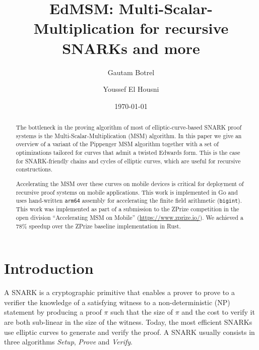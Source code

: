 \documentclass[journal=tches,spthm]{iacrtrans}
\title{EdMSM: Multi-Scalar-Multiplication for recursive SNARKs and more}
\author{Gautam Botrel \inst{1} \and Youssef El Housni \inst{1,2,3}}
\institute{ConsenSys R\&D, gnark team  \\
   \email{{firstname.lastname}@consensys.net}
  \and
    LIX, CNRS, \'{E}cole Polytechnique, Institut Polytechnique de Paris
  \and
    Inria
}
\date{\today}
\begin{document}
\maketitle


\begin{abstract}
The bottleneck in the proving algorithm of most of elliptic-curve-based SNARK
    proof systems is the Multi-Scalar-Multiplication (MSM) algorithm. In this
    paper we give an overview of a variant of the Pippenger MSM algorithm
    together with a set of optimizations tailored for curves that admit a
    twisted Edwards form. This is the case for SNARK-friendly chains and cycles
    of elliptic curves, which are useful for recursive constructions.

Accelerating the MSM over these curves on mobile devices is critical
    for deployment of recursive proof systems on mobile applications.
    This work is implemented in Go and uses hand-written
    \texttt{arm64} assembly for accelerating the finite field
    arithmetic (\texttt{bigint}).  This work was implemented as part
    of a submission to the ZPrize competition in the open division
    ``Accelerating MSM on Mobile'' (\url{https://www.zprize.io/}).
    We achieved a 78\% speedup over the ZPrize baseline implementation
    in Rust.
\end{abstract}

\section{Introduction}
A SNARK is a cryptographic primitive that enables a prover to prove to a
verifier the knowledge of a satisfying witness to a non-deterministic (NP)
statement by producing a proof $\pi$ such that the size of $\pi$ and the cost
to verify it are both sub-linear in the size of the witness. Today, the most
efficient SNARKs use elliptic curves to generate and verify the proof.  A SNARK
usually consists in three algorithms \textit{Setup}, \textit{Prove} and
\textit{Verify}.
\end{document}
